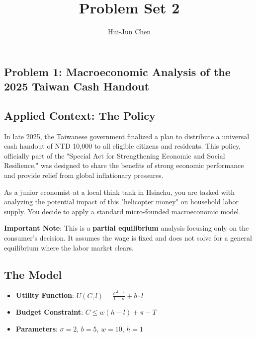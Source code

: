 \documentclass[14pt]{extarticle}
\title{Problem Set 2}
\author{Hui-Jun Chen}
\newcommand{\red}[1]{\textcolor{red}{#1}}
\newcommand{\showAns}{\setboolean{showAns}{true}}
\begin{document}
\maketitle

\showAns




\begin{Exercise}

\section*{Problem 1: Macroeconomic Analysis of the 2025 Taiwan Cash Handout}

\subsection*{Applied Context: The Policy}
In late 2025, the Taiwanese government finalized a plan to distribute a universal cash handout of NTD 10,000 to all eligible citizens and residents. This policy, officially part of the "Special Act for Strengthening Economic and Social Resilience," was designed to share the benefits of strong economic performance and provide relief from global inflationary pressures.

As a junior economist at a local think tank in Hsinchu, you are tasked with analyzing the potential impact of this "helicopter money" on household labor supply. You decide to apply a standard micro-founded macroeconomic model.

\textbf{Important Note}: This is a \textbf{partial equilibrium} analysis focusing only on the consumer's decision. It assumes the wage is fixed and does not solve for a general equilibrium where the labor market clears.

\subsection*{The Model}
\begin{itemize}
    \item \textbf{Utility Function}: $U(C, l) = \frac{C^{1-\sigma}}{1-\sigma} + b \cdot l$
    \item \textbf{Budget Constraint}: $C \le w(h - l) + \pi - T$
    \item \textbf{Parameters}: $\sigma = 2$, $b = 5$, $w = 10$, $h = 1$
\end{itemize}


\end{Exercise}
\end{document}

